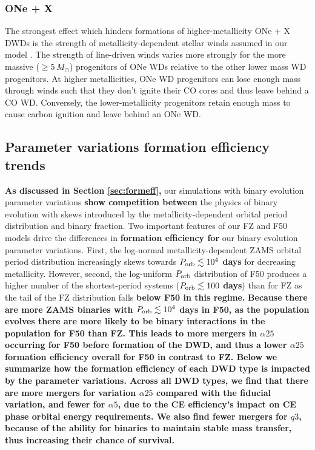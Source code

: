 \documentclass[twocolumn, linenumbers]{aastex631}
\begin{document}
\subsubsection{\textbf{ONe + X}}\label{formeff_ONe}
The strongest effect which hinders formations of higher-metallicity ONe + 
X DWDs is the strength of metallicity-dependent stellar winds assumed in 
our model \citep{Vink2001}. The strength of line-driven winds varies more 
strongly for the more massive ($\geq5\,M_\odot$) progenitors of ONe WDs 
relative to the other lower mass WD progenitors. At higher metallicities, 
ONe WD progenitors can lose enough mass through winds such that they don't 
ignite their CO cores and thus leave behind a CO WD. Conversely, the 
lower-metallicity progenitors retain enough mass to cause carbon ignition 
and leave behind an ONe WD. 


\subsection{Parameter variations formation efficiency 
trends}\label{subsec:formeff_vars}

\textbf{As discussed in Section \ref{sec:formeff},} our simulations with 
binary evolution parameter variations \textbf{show competition between} 
the physics of binary evolution with skews introduced by the 
metallicity-dependent orbital period distribution and binary fraction. Two 
important features of our FZ and F50 models drive the differences in 
\textbf{formation efficiency for} our binary evolution parameter 
variations. First, the log-normal metallicity-dependent ZAMS orbital 
period distribution increasingly skews towards 
\textbf{$P_{\rm{orb}}\lesssim 10^4$ days} for decreasing metallicity. 
However, second, the log-uniform $P_{\rm{orb}}$ distribution of F50 
produces a higher number of the shortest-period systems 
(\textbf{$P_{\rm{orb}}\lesssim 100$ days}) than for FZ as the tail of the 
FZ distribution falls \textbf{below F50 in this regime.} \textbf{Because 
there are more ZAMS binaries with $P_{\rm{orb}} \lesssim 10^4$ days in 
F50, as the population evolves there are more likely to be binary 
interactions in the population for F50 than FZ. This leads to more mergers 
in $\alpha25$ occurring for F50 before formation of the DWD, and thus a 
lower $\alpha25$ formation efficiency overall for F50 in contrast to FZ. 
Below we summarize how the formation efficiency of each DWD type is 
impacted by the parameter variations. Across all DWD types, we find that 
there are more mergers for variation $\alpha25$ compared with the fiducial 
variation, and fewer for $\alpha5$, due to the CE efficiency's impact on 
CE phase orbital energy requirements. We also find fewer mergers for $q3$, 
because of the ability for binaries to maintain stable mass transfer, thus 
increasing their chance of survival.}
\end{document}
